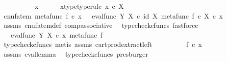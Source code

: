 \begin{isabellebody}
\ \ \isamarkupfalse%
\ {\isacharminus}{\kern0pt}\isanewline
\ \ \ \ \isamarkupfalse%
\ x\isanewline
\ \ \ \ \isamarkupfalse%
\ x{\isacharunderscore}{\kern0pt}type{\isacharbrackleft}{\kern0pt}type{\isacharunderscore}{\kern0pt}rule{\isacharbrackright}{\kern0pt}{\isacharcolon}{\kern0pt}\ {\isachardoublequoteopen}x\ {\isasymin}\isactrlsub c\ X{\isachardoublequoteclose}\isanewline
\isanewline
\ \ \ \ \isamarkupfalse%
\ {\isachardoublequoteopen}cnufatem\ {\isacharparenleft}{\kern0pt}metafunc\ f{\isacharparenright}{\kern0pt}\ {\isasymcirc}\isactrlsub c\ x\ {\isacharequal}{\kern0pt}\ \ eval{\isacharunderscore}{\kern0pt}func\ Y\ X\ {\isasymcirc}\isactrlsub c\ {\isasymlangle}id\ X{\isacharcomma}{\kern0pt}\ {\isacharparenleft}{\kern0pt}metafunc\ f{\isacharparenright}{\kern0pt}\ {\isasymcirc}\isactrlsub c\ {\isasymbeta}\isactrlbsub X\isactrlesub {\isasymrangle}\ {\isasymcirc}\isactrlsub c\ x{\isachardoublequoteclose}\isanewline
\ \ \ \ \ \ \isamarkupfalse%
\ assms\ cnufatem{\isacharunderscore}{\kern0pt}def{}\ comp{\isacharunderscore}{\kern0pt}associative{}\ \isamarkupfalse%
\ {\isacharparenleft}{\kern0pt}typecheck{\isacharunderscore}{\kern0pt}cfuncs{\isacharcomma}{\kern0pt}\ fastforce{\isacharparenright}{\kern0pt}\isanewline
\ \ \ \ \isamarkupfalse%
\ \isamarkupfalse%
\ {\isachardoublequoteopen}{\isachardot}{\kern0pt}{\isachardot}{\kern0pt}{\isachardot}{\kern0pt}\ {\isacharequal}{\kern0pt}\ eval{\isacharunderscore}{\kern0pt}func\ Y\ X\ {\isasymcirc}\isactrlsub c\ {\isasymlangle}x{\isacharcomma}{\kern0pt}\ {\isacharparenleft}{\kern0pt}metafunc\ f{\isacharparenright}{\kern0pt}{\isasymrangle}{\isachardoublequoteclose}\isanewline
\ \ \ \ \ \ \isamarkupfalse%
\ {\isacharparenleft}{\kern0pt}typecheck{\isacharunderscore}{\kern0pt}cfuncs{\isacharcomma}{\kern0pt}\ metis\ assms\ cart{\isacharunderscore}{\kern0pt}prod{\isacharunderscore}{\kern0pt}extract{\isacharunderscore}{\kern0pt}left{\isacharparenright}{\kern0pt}\isanewline
\ \ \ \ \isamarkupfalse%
\ \isamarkupfalse%
\ {\isachardoublequoteopen}{\isachardot}{\kern0pt}{\isachardot}{\kern0pt}{\isachardot}{\kern0pt}\ {\isacharequal}{\kern0pt}\ f\ {\isasymcirc}\isactrlsub c\ x{\isachardoublequoteclose}\isanewline
\ \ \ \ \ \ \isamarkupfalse%
\ assms\ eval{\isacharunderscore}{\kern0pt}lemma\ \isamarkupfalse%
\ {\isacharparenleft}{\kern0pt}typecheck{\isacharunderscore}{\kern0pt}cfuncs{\isacharcomma}{\kern0pt}\ presburger{\isacharparenright}{\kern0pt}\isanewline

\end{isabellebody}
